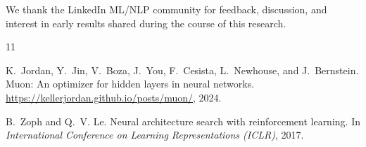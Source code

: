 \documentclass[11pt]{article}
\begin{document}
We thank the LinkedIn ML/NLP community for feedback, discussion, and interest in early results shared during the course of this research.



\begin{thebibliography}{11}

K.~Jordan, Y.~Jin, V.~Boza, J.~You, F.~Cesista, L.~Newhouse, and J.~Bernstein.
\newblock Muon: An optimizer for hidden layers in neural networks.
\newblock \url{https://kellerjordan.github.io/posts/muon/}, 2024.

B.~Zoph and Q.~V. Le.
\newblock Neural architecture search with reinforcement learning.
\newblock In \emph{International Conference on Learning Representations ({ICLR})}, 2017.

\end{thebibliography}
\end{document}
